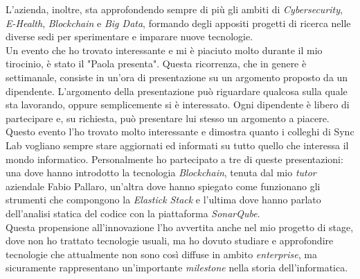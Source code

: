 L'azienda, inoltre, sta approfondendo sempre di più gli ambiti di \emph{Cybersecurity}, \emph{E-Health}, \emph{Blockchain} e \emph{Big Data}, formando degli appositi progetti di ricerca nelle diverse sedi per sperimentare e imparare nuove tecnologie. \\

Un evento che ho trovato interessante e mi è piaciuto molto durante il mio tirocinio, è stato il "Paola presenta". 
Questa ricorrenza, che in genere è settimanale, consiste in un'ora di presentazione su un argomento proposto da un dipendente. L'argomento della presentazione può riguardare qualcosa sulla quale sta lavorando, oppure semplicemente si è interessato. 
Ogni dipendente è libero di partecipare e, su richiesta, può presentare lui stesso un argomento a piacere. Questo evento l'ho trovato molto interessante e dimostra quanto i colleghi di Sync Lab vogliano sempre stare aggiornati ed informati su tutto quello che interessa il mondo informatico. 
Personalmente ho partecipato a tre di queste presentazioni: una dove hanno introdotto la tecnologia \emph{Blockchain}, tenuta dal mio \emph{tutor} aziendale Fabio Pallaro, un'altra dove hanno spiegato come funzionano gli strumenti che compongono la \emph{Elastick Stack} e l'ultima dove hanno parlato dell'analisi statica del codice con la piattaforma \emph{SonarQube}. \\

Questa propensione all'innovazione l'ho avvertita anche nel mio progetto di stage, dove non ho trattato tecnologie usuali, ma ho dovuto studiare e approfondire tecnologie che attualmente non sono così diffuse in ambito \emph{enterprise}, ma sicuramente rappresentano un'importante \emph{milestone} nella storia dell'informatica.
